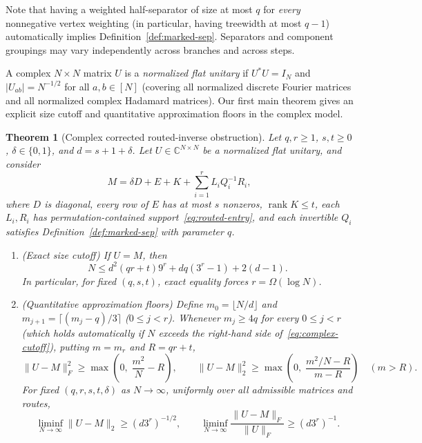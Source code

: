 \documentclass[11pt,reqno]{amsart}
\numberwithin{equation}{section}
\newtheorem{theorem}{Theorem}[section]
\theoremstyle{definition}
\theoremstyle{remark}
\newcommand{\C}{\mathbb{C}}
\newcommand{\rank}{\operatorname{rank}}
\begin{document}
Note that having a weighted half-separator of size at most $q$ for \emph{every} nonnegative vertex weighting (in particular, having treewidth at most $q-1$) automatically implies Definition~\ref{def:marked-sep}. Separators and component groupings may vary independently across branches and across steps.

A complex $N\times N$ matrix $U$ is a \emph{normalized flat unitary} if $U^*U = I_N$ and $|U_{ab}| = N^{-1/2}$ for all $a,b\in[N]$ (covering all normalized discrete Fourier matrices and all normalized complex Hadamard matrices). Our first main theorem gives an explicit size cutoff and quantitative approximation floors in the complex model.

\begin{theorem}[Complex corrected routed-inverse obstruction]
\label{thm:complex-routed}
Let $q,r\ge 1$, $s,t\ge 0$, $\delta\in\{0,1\}$, and $d = s + 1 + \delta$. Let $U\in\C^{N\times N}$ be a normalized flat unitary, and consider
\begin{equation}
\label{eq:complex-model}
M = \delta D + E + K + \sum_{i=1}^r L_i Q_i^{-1} R_i,
\end{equation}
where $D$ is diagonal, every row of $E$ has at most $s$ nonzeros, $\rank K\le t$, each $L_i,R_i$ has permutation-contained support~\eqref{eq:routed-entry}, and each invertible $Q_i$ satisfies Definition~\ref{def:marked-sep} with parameter $q$.
\begin{enumerate}[label=(\alph*),leftmargin=2em]
\item \emph{(Exact size cutoff)} If $U = M$, then
\begin{equation}
\label{eq:complex-cutoff}
N \le d^2(qr + t)9^r + dq(3^r - 1) + 2(d - 1).
\end{equation}
In particular, for fixed $(q,s,t)$, exact equality forces $r = \Omega(\log N)$.
\item \emph{(Quantitative approximation floors)} Define $m_0 = \lfloor N/d\rfloor$ and $m_{j+1} = \lceil(m_j - q)/3\rceil$ ($0\le j<r$). Whenever $m_j\ge 4q$ for every $0\le j<r$ (which holds automatically if $N$ exceeds the right-hand side of~\eqref{eq:complex-cutoff}), putting $m = m_r$ and $R = qr + t$,
\begin{equation}
\label{eq:complex-floors}
\|U - M\|_F^2 \ge \max\!\left(0,\; \frac{m^2}{N} - R\right),\qquad
\|U - M\|_2^2 \ge \max\!\left(0,\; \frac{m^2/N - R}{m - R}\right)\quad (m > R).
\end{equation}
For fixed $(q,r,s,t,\delta)$ as $N\to\infty$, uniformly over all admissible matrices and routes,
\begin{equation}
\label{eq:asymp-floors}
\liminf_{N\to\infty}\|U - M\|_2 \ge (d3^r)^{-1/2},\qquad
\liminf_{N\to\infty}\frac{\|U - M\|_F}{\|U\|_F} \ge (d3^r)^{-1}.
\end{equation}
\end{enumerate}
\end{theorem}
\end{document}
